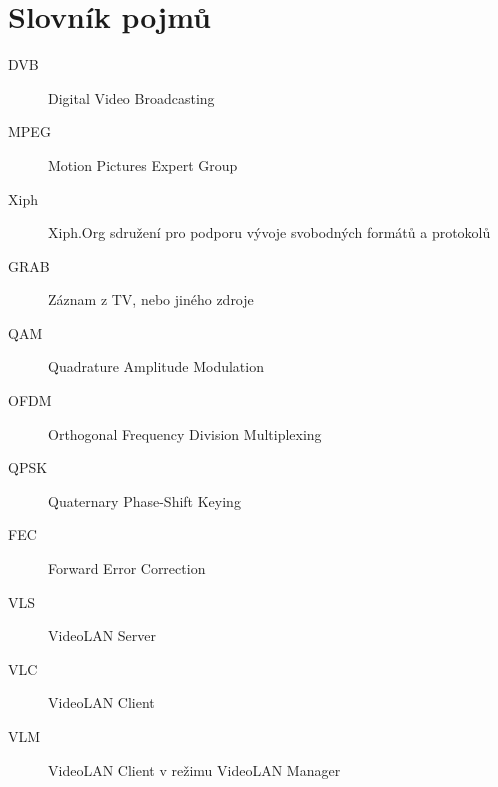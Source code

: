 
\chapter{Slovník pojmů}
\begin{description}
\item[DVB] Digital Video Broadcasting
\item[MPEG] Motion Pictures Expert Group
\item[Xiph] Xiph.Org sdružení pro podporu vývoje svobodných formátů a protokolů
\item[GRAB] Záznam z TV, nebo jiného zdroje
\item[QAM] Quadrature Amplitude Modulation
\item[OFDM] Orthogonal Frequency Division Multiplexing
\item[QPSK] Quaternary Phase-Shift Keying 
\item[FEC] Forward Error Correction 
\item[VLS] VideoLAN Server 
\item[VLC] VideoLAN Client 
\item[VLM] VideoLAN Client v režimu VideoLAN Manager 
\end{description}

